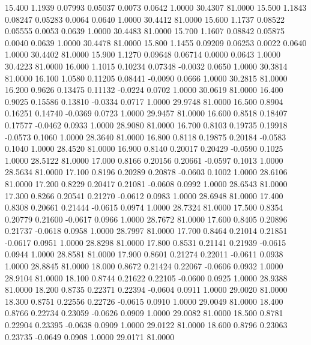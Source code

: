   15.400   1.1939   0.07993   0.05037   0.0073   0.0642   1.0000  30.4307  81.0000
  15.500   1.1843   0.08247   0.05283   0.0064   0.0640   1.0000  30.4412  81.0000
  15.600   1.1737   0.08522   0.05555   0.0053   0.0639   1.0000  30.4483  81.0000
  15.700   1.1607   0.08842   0.05875   0.0040   0.0639   1.0000  30.4478  81.0000
  15.800   1.1455   0.09209   0.06253   0.0022   0.0640   1.0000  30.4402  81.0000
  15.900   1.1270   0.09648   0.06714   0.0000   0.0643   1.0000  30.4223  81.0000
  16.000   1.1015   0.10234   0.07348  -0.0032   0.0650   1.0000  30.3814  81.0000
  16.100   1.0580   0.11205   0.08441  -0.0090   0.0666   1.0000  30.2815  81.0000
  16.200   0.9626   0.13475   0.11132  -0.0224   0.0702   1.0000  30.0619  81.0000
  16.400   0.9025   0.15586   0.13810  -0.0334   0.0717   1.0000  29.9748  81.0000
  16.500   0.8904   0.16251   0.14740  -0.0369   0.0723   1.0000  29.9457  81.0000
  16.600   0.8518   0.18407   0.17577  -0.0462   0.0933   1.0000  28.9080  81.0000
  16.700   0.8103   0.19735   0.19918  -0.0573   0.1060   1.0000  28.3640  81.0000
  16.800   0.8118   0.19875   0.20184  -0.0583   0.1040   1.0000  28.4520  81.0000
  16.900   0.8140   0.20017   0.20429  -0.0590   0.1025   1.0000  28.5122  81.0000
  17.000   0.8166   0.20156   0.20661  -0.0597   0.1013   1.0000  28.5634  81.0000
  17.100   0.8196   0.20289   0.20878  -0.0603   0.1002   1.0000  28.6106  81.0000
  17.200   0.8229   0.20417   0.21081  -0.0608   0.0992   1.0000  28.6543  81.0000
  17.300   0.8266   0.20541   0.21270  -0.0612   0.0983   1.0000  28.6948  81.0000
  17.400   0.8308   0.20661   0.21444  -0.0615   0.0974   1.0000  28.7324  81.0000
  17.500   0.8354   0.20779   0.21600  -0.0617   0.0966   1.0000  28.7672  81.0000
  17.600   0.8405   0.20896   0.21737  -0.0618   0.0958   1.0000  28.7997  81.0000
  17.700   0.8464   0.21014   0.21851  -0.0617   0.0951   1.0000  28.8298  81.0000
  17.800   0.8531   0.21141   0.21939  -0.0615   0.0944   1.0000  28.8581  81.0000
  17.900   0.8601   0.21274   0.22011  -0.0611   0.0938   1.0000  28.8845  81.0000
  18.000   0.8672   0.21424   0.22067  -0.0606   0.0932   1.0000  28.9104  81.0000
  18.100   0.8744   0.21622   0.22105  -0.0600   0.0925   1.0000  28.9388  81.0000
  18.200   0.8735   0.22371   0.22394  -0.0604   0.0911   1.0000  29.0020  81.0000
  18.300   0.8751   0.22556   0.22726  -0.0615   0.0910   1.0000  29.0049  81.0000
  18.400   0.8766   0.22734   0.23059  -0.0626   0.0909   1.0000  29.0082  81.0000
  18.500   0.8781   0.22904   0.23395  -0.0638   0.0909   1.0000  29.0122  81.0000
  18.600   0.8796   0.23063   0.23735  -0.0649   0.0908   1.0000  29.0171  81.0000
